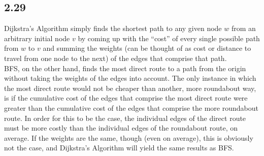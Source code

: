 \documentclass[letterpaper,12pt]{article}
\theoremstyle{definition}
\begin{document}
\subsection*{2.29}
Dijkstra's Algorithm simply finds the shortest path to any given node $w$ from an arbitrary initial node $v$ by coming up with the ``cost'' of every single possible path from $w$ to $v$ and summing the weights (can be thought of as cost or distance to travel from one node to the next) of the edges that comprise that path. \\ 
BFS, on the other hand, finds the most direct route to a path from the origin without taking the weights of the edges into account. The only instance in which the most direct route would not be cheaper than another, more roundabout way, is if the cumulative cost of the edges that comprise the most direct route were greater than the cumulative cost of the edges that comprise the more roundabout route. 
In order for this to be the case, the individual edges of the direct route must be more costly than the individual edges of the roundabout route, on average. If the weights are the same, though (even on average), this is obviously not the case, and Dijkstra's Algorithm will yield the same results as BFS.
\end{document}
